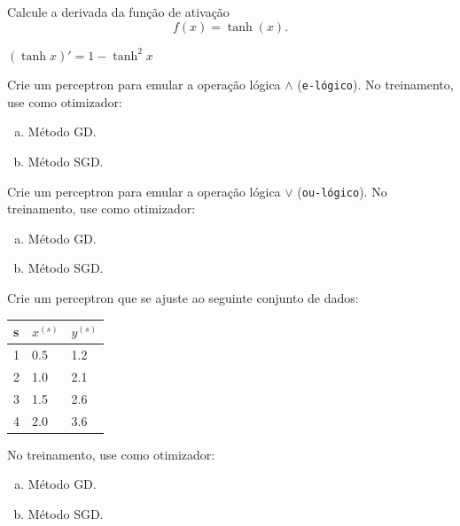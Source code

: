 \begin{exer}
  Calcule a derivada da função de ativação
  \begin{equation}
    f(x) = \tanh(x).
  \end{equation}
\end{exer}
\begin{resp}
  $(\tanh x)' = 1 - \tanh^2 x$
\end{resp}

\begin{exer}
  Crie um perceptron para emular a operação lógica $\land$ (\texttt{e-lógico}). No treinamento, use como otimizador:
  \begin{enumerate}[a)]
  \item Método GD.
  \item Método SGD.
  \end{enumerate}
\end{exer}

\begin{exer}
  Crie um perceptron para emular a operação lógica $\lor$ (\texttt{ou-lógico}). No treinamento, use como otimizador:
  \begin{enumerate}[a)]
  \item Método GD.
  \item Método SGD.
  \end{enumerate}
\end{exer}

\begin{exer}\label{cap_perceptron_sec_train:exer:ajuste}
  Crie um perceptron que se ajuste ao seguinte conjunto de dados:
  \begin{center}
    \begin{tabular}{l|ll}
      s & $x^{(s)}$ & $y^{(s)}$\\\hline
      1 & 0.5 & 1.2\\
      2 & 1.0 & 2.1\\
      3 & 1.5 & 2.6\\
      4 & 2.0 & 3.6\\\hline
    \end{tabular}
  \end{center}
  No treinamento, use como otimizador:
  \begin{enumerate}[a)]
  \item Método GD.
  \item Método SGD.
  \end{enumerate}  
\end{exer}
